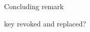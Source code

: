 \documentclass[aspectratio=169, lualatex, handout, 10pt,dvipsnames,svgnames]{beamer} %
\begin{document}
\begin{frame}{Concluding remark}
\begin{itemize}
key revoked and replaced? 
  \end{itemize}
  
\end{frame}
\end{document}
